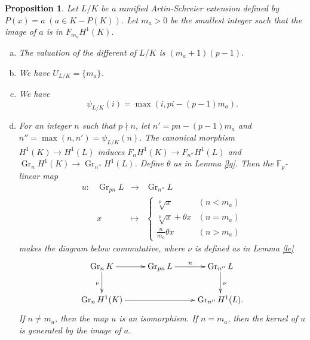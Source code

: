 \documentclass[10pt,a4paper]{amsart}
\numberwithin{equation}{section}
\newcommand{\Gr}{\operatorname{Gr}}
\theoremstyle{plain}
\newtheorem{prop}[theo]{Proposition}
\theoremstyle{definition}
\begin{document}
      \begin{prop}\label{ls}
        Let $L/K$ be a ramified Artin-Schreier extension defined by $P(x)=a\;(a\in K-P(K))$. Let $m_a>0$ be the smallest integer such that the image of $a$ is in $F_{m_a}H^1(K)$. 
        \begin{enumerate}[(a)]
          \item\label{ls-4} The valuation of the different of $L/K$ is $(m_a+1)(p-1)$.
          \item\label{ls-1} We have $U_{L/K}=\{m_a\}$.
      \item\label{ls-3} We have
    \begin{equation}
\psi_{L/K}(i)=\max(i,pi-(p-1)m_a).
\end{equation}
\item\label{ls-2} For an integer $n$ such that $p\nmid n$, let $n'=pn-(p-1)m_a$ and $n''=\max(n,n')=\psi_{L/K}(n)$. The canonical morphism $H^1(K)\to H^1(L)$ induces $F_nH^1(K)\to F_{n''}H^1(L)$ and $\Gr_nH^1(K)\to \Gr_{n''}H^1(L)$. Define $\theta$ as in Lemma \ref{lg}. Then the $\mathbb{F}_p$-linear map
    \begin{equation}
    \begin{array}{cccc}
      u:&\Gr_{pn}L&\to&\Gr_{n''}L\\
      &x&\mapsto&\left\{
      \begin{array}{ll}
        \sqrt[p]{x}&(n<m_a)\\
        \sqrt[p]{x}+\theta x&(n=m_a)\\
        \frac{n}{m_a}\theta x&(n>m_a)
      \end{array}
      \right.
    \end{array}
    \end{equation}
    makes the diagram below commutative, where $\nu$ is defined as in Lemma \ref{le}
    \begin{equation} \label{db}
    \xymatrix{
      \Gr_nK\ar[r]\ar[d]_{\nu}&\Gr_{pn}L\ar[r]^{u}&\Gr_{n''}L\ar[d]^{\nu}\\
      \Gr_nH^1(K)\ar[rr]&&\Gr_{n''}H^1(L).
    }
    \end{equation}
    If $n\neq m_a$, then the map $u$ is an isomorphism. If $n=m_a$, then the kernel of $u$ is generated by the image of $a$.
    \end{enumerate}
 \end{prop}
\end{document}
